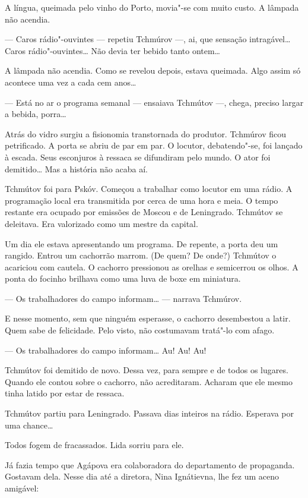 A língua, queimada pelo vinho do Porto, movia"-se com muito custo. A
lâmpada não acendia.

--- Caros rádio"-ouvintes --- repetiu Tchmúrov ---, ai, que sensação
intragável\ldots{} Caros rádio"-ouvintes\ldots{} Não devia ter bebido tanto
ontem\ldots{}

A lâmpada não acendia. Como se revelou depois, estava queimada. Algo
assim só acontece uma vez a cada cem anos\ldots{}

--- Está no ar o programa semanal --- ensaiava Tchmútov ---, chega,
preciso largar a bebida, porra\ldots{}

Atrás do vidro surgiu a fisionomia transtornada do produtor. Tchmúrov
ficou petrificado. A porta se abriu de par em par. O locutor,
debatendo"-se, foi lançado à escada. Seus esconjuros à ressaca se
difundiram pelo mundo. O ator foi demitido\ldots{} Mas a história não acaba
aí.

Tchmútov foi para Pskóv. Começou a trabalhar como locutor em uma rádio.
A programação local era transmitida por cerca de uma hora e meia. O
tempo restante era ocupado por emissões de Moscou e de Leningrado.
Tchmútov se deleitava. Era valorizado como um mestre da capital.

Um dia ele estava apresentando um programa. De repente, a porta deu um
rangido. Entrou um cachorrão marrom. (De quem? De onde?) Tchmútov o
acariciou com cautela. O cachorro pressionou as orelhas e semicerrou os
olhos. A ponta do focinho brilhava como uma luva de boxe em miniatura.

--- Os trabalhadores do campo informam\ldots{} --- narrava Tchmúrov.

E nesse momento, sem que ninguém esperasse, o cachorro desembestou a
latir. Quem sabe de felicidade. Pelo visto, não costumavam tratá"-lo com
afago.

--- Os trabalhadores do campo informam\ldots{} Au! Au! Au!

Tchmútov foi demitido de novo. Dessa vez, para sempre e de todos os
lugares. Quando ele contou sobre o cachorro, não acreditaram. Acharam
que ele mesmo tinha latido por estar de ressaca.

Tchmútov partiu para Leningrado. Passava dias inteiros na rádio.
Esperava por uma chance\ldots{}

Todos fogem de fracassados. Lida sorriu para ele.

Já fazia tempo que Agápova era colaboradora do departamento de
propaganda. Gostavam dela. Nesse dia até a diretora, Nina Ignátievna,
lhe fez um aceno amigável:

